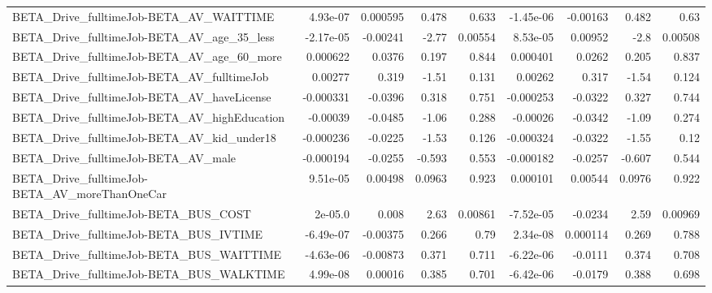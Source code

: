 \begin{tabular}{lrrrrrrrr}
BETA\_Drive\_fulltimeJob-BETA\_AV\_WAITTIME            &    4.93e-07 &     0.000595 &    0.478 &    0.633 &  -1.45e-06 &    -0.00163 &        0.482 &          0.63 \\
BETA\_Drive\_fulltimeJob-BETA\_AV\_age\_35\_less         &   -2.17e-05 &     -0.00241 &    -2.77 &  0.00554 &   8.53e-05 &     0.00952 &         -2.8 &       0.00508 \\
BETA\_Drive\_fulltimeJob-BETA\_AV\_age\_60\_more         &    0.000622 &       0.0376 &    0.197 &    0.844 &   0.000401 &      0.0262 &        0.205 &         0.837 \\
BETA\_Drive\_fulltimeJob-BETA\_AV\_fulltimeJob         &     0.00277 &        0.319 &    -1.51 &    0.131 &    0.00262 &       0.317 &        -1.54 &         0.124 \\
BETA\_Drive\_fulltimeJob-BETA\_AV\_haveLicense         &   -0.000331 &      -0.0396 &    0.318 &    0.751 &  -0.000253 &     -0.0322 &        0.327 &         0.744 \\
BETA\_Drive\_fulltimeJob-BETA\_AV\_highEducation       &    -0.00039 &      -0.0485 &    -1.06 &    0.288 &   -0.00026 &     -0.0342 &        -1.09 &         0.274 \\
BETA\_Drive\_fulltimeJob-BETA\_AV\_kid\_under18         &   -0.000236 &      -0.0225 &    -1.53 &    0.126 &  -0.000324 &     -0.0322 &        -1.55 &          0.12 \\
BETA\_Drive\_fulltimeJob-BETA\_AV\_male                &   -0.000194 &      -0.0255 &   -0.593 &    0.553 &  -0.000182 &     -0.0257 &       -0.607 &         0.544 \\
BETA\_Drive\_fulltimeJob-BETA\_AV\_moreThanOneCar      &    9.51e-05 &      0.00498 &   0.0963 &    0.923 &   0.000101 &     0.00544 &       0.0976 &         0.922 \\
BETA\_Drive\_fulltimeJob-BETA\_BUS\_COST               &     2e-05.0 &        0.008 &     2.63 &  0.00861 &  -7.52e-05 &     -0.0234 &         2.59 &       0.00969 \\
BETA\_Drive\_fulltimeJob-BETA\_BUS\_IVTIME             &   -6.49e-07 &     -0.00375 &    0.266 &     0.79 &   2.34e-08 &    0.000114 &        0.269 &         0.788 \\
BETA\_Drive\_fulltimeJob-BETA\_BUS\_WAITTIME           &   -4.63e-06 &     -0.00873 &    0.371 &    0.711 &  -6.22e-06 &     -0.0111 &        0.374 &         0.708 \\
BETA\_Drive\_fulltimeJob-BETA\_BUS\_WALKTIME           &    4.99e-08 &      0.00016 &    0.385 &    0.701 &  -6.42e-06 &     -0.0179 &        0.388 &         0.698 \\

\end{tabular}
